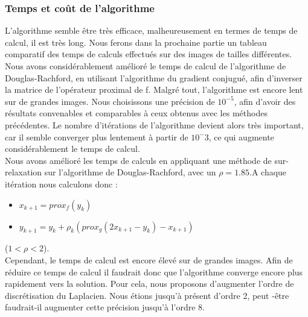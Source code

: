 \subsubsection{Temps et coût de l'algorithme}
L'algorithme semble être très efficace, malheureusement en termes de temps de calcul, il est très long. Nous ferons dans la prochaine partie un tableau comparatif des temps de calculs effectués sur des images de tailles différentes.\\
Nous avons considérablement amélioré  le temps de calcul de l'algorithme de Douglas-Rachford, en utilisant l'algorithme du gradient conjugué, afin d'inverser la matrice de l'opérateur proximal de f. Malgré tout, l'algorithme est encore lent sur de grandes images. Nous choisissons une précision de $10^{-5}$, afin d'avoir des résultats convenables et comparables à ceux obtenus avec les méthodes précédentes. Le nombre d'itérations de l'algorithme devient alors très important, car il semble converger plus lentement à partir de $10^-3$, ce qui augmente considérablement le temps de calcul.\\
Nous avons amélioré les temps de calculs en appliquant une méthode de sur-relaxation sur l'algorithme de Douglas-Rachford, avec un $\rho  =1.85$.A chaque itération nous calculons donc :
\begin{center} 
\begin{itemize}
\item $x_{k+1} = prox_f(y_k)$
\item $y_{k+1} = y_k+\rho_k(prox_g(2x_{k+1}-y_k)-x_{k+1})$
\end{itemize}
\end{center}
($1<\rho<2$).\\
Cependant, le temps de calcul est encore élevé sur de grandes images.
Afin de réduire ce temps de calcul il faudrait donc que l'algorithme converge encore plus rapidement vers la solution. Pour cela, nous proposons d'augmenter l'ordre de discrétisation du Laplacien. Nous étions jusqu'à présent d'ordre 2, peut -être faudrait-il augmenter cette précision jusqu'à l'ordre 8.
